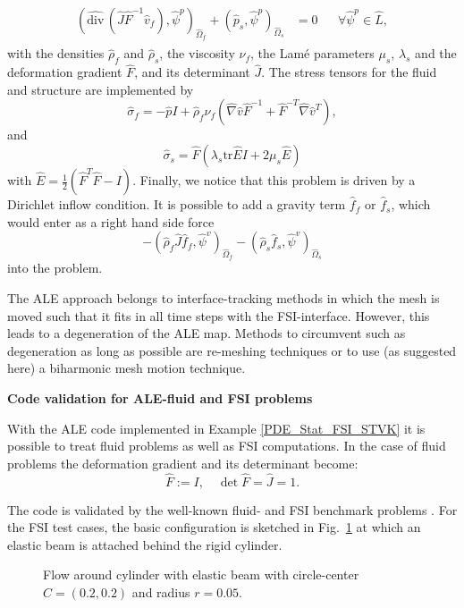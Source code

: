 \begin{Problem}
\begin{eqnarray*}
\begin{aligned}
      (\widehat{\text{div}}\,(\hat J\hat F^{-1}
      \hat v_f),\hat\psi^p)_{\hat\Omega_f} 
      + (\hat p_s ,\hat \psi^p)_{\hat\Omega_s}
      &=0&&\forall\hat\psi^p\in \hat L,
    \end{aligned}
  \end{eqnarray*}  
  with the densities $\hat\rho_f$ and $\hat\rho_s$, 
the viscosity $\nu_f$, the Lam\'e parameters 
$\mu_s$, $\lambda_s$ and the deformation gradient $\hat F$, and its
determinant $\hat J$. The stress tensors for the fluid and structure are
implemented by 
\[
\hat\sigma_f = -\hat pI + \hat\rho_f\nu_f (\hat\nabla\hat v \hat F^{-1}
  + \hat F^{-T} \hat\nabla\hat v^T),
\] 
and 
\[
\hat\sigma_s = \hat F (\lambda_s \text{tr}\hat E I + 2\mu_s \hat E)
\]
with $\hat E = \frac{1}{2}(\hat F^T \hat F - I)$.
Finally, we notice that this problem is driven by a Dirichlet 
inflow condition. It is possible to add a gravity term $\hat f_f$ or 
$\hat f_s$, which 
would enter as a right hand side force 
\[
- (\hat\rho_f \hat J\hat f_f, \hat\psi^v)_{\hat\Omega_f}
      - (\hat\rho_s\hat f_s, \hat\psi^v)_{\hat\Omega_s}
\]
into the problem.
\end{Problem}
The ALE approach belongs to interface-tracking methods in which 
the mesh is moved such that it fits in all time steps with 
the FSI-interface. However, this leads to 
a degeneration of the ALE map. Methods to circumvent such as 
degeneration as long as possible are re-meshing techniques or 
to use (as suggested here) a biharmonic mesh motion technique.






\textbf{Code validation for ALE-fluid and FSI problems}

With the ALE code implemented in Example 
\ref{PDE_Stat_FSI_STVK} it is possible to treat fluid 
problems as well as FSI computations. 
In the case of fluid problems the deformation
gradient and its determinant become:
\begin{equation*}
\hat F:= I , \quad \det \hat F = \hat J = 1.
\end{equation*}

The code is validated by the well-known 
fluid- and FSI benchmark problems \cite{SchaeTu96, HrTu06b}. 
For the FSI test cases, 
the basic configuration is 
sketched in Fig.~\ref{configuration_csm_and_fsi_2D} 
at which an elastic beam is attached 
behind the rigid cylinder. 

\begin{figure}[h]
\centering

\caption{Flow around cylinder with elastic beam with 
circle-center $C=(0.2,0.2)$ and radius $r=0.05$.}
\label{configuration_csm_and_fsi_2D}
\end{figure}


